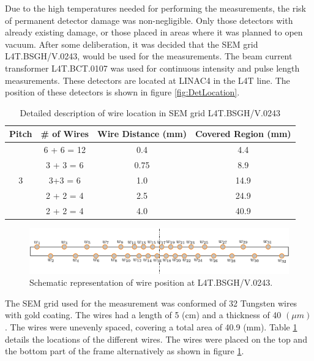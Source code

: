Due to the high temperatures needed for performing the measurements, the risk of permanent detector damage was non-negligible. Only those detectors with already existing damage, or those placed in areas where it was planned to open vacuum. After some deliberation, it was decided that the SEM grid L4T.BSGH/V.0243, would be used for the measurements. The beam current transformer L4T.BCT.0107 was used for continuous intensity and pulse length measurements. These detectors are located at LINAC4 in the L4T line. The position of these detectors is shown in figure \ref{fig:DetLocation}. 

\begin{table}[h]
    \centering
    \begin{tabular}{cccc}
    \hline
    Pitch   & \# of Wires & Wire Distance (mm) & Covered Region (mm) \\ \hline
    \multirow{5}{*}{3} & 6 + 6 = 12  & 0.4                & 4.4                 \\
                       & 3 + 3 = 6   & 0.75               & 8.9                 \\
                       & 3+3 = 6     & 1.0                & 14.9                \\
                       & 2 + 2 = 4   & 2.5                & 24.9                \\
                       & 2 + 2 = 4   & 4.0                & 40.9                \\ \hline
    \end{tabular}
    \caption{Detailed description of wire location in SEM grid L4T.BSGH/V.0243}
    \label{tab:WireSpacing}
\end{table}
\begin{figure}[h]
    \centering
    \includegraphics[width=1.0\columnwidth]{Figure_SemGridSchema/SemGridSchema.pdf}
    \caption{Schematic representation of wire position at L4T.BSGH/V.0243. }
    \label{fig:WireSpacing}
\end{figure}

The SEM grid used for the measurement was conformed of 32 Tungsten wires with gold coating. The wires had a length of 5 (cm) and a thickness of 40 $(\mu m)$. The wires were unevenly spaced, covering a total area of 40.9 (mm). Table \ref{tab:WireSpacing} details the locations of the different wires. The wires were placed on the top and the bottom part of the frame alternatively as shown in figure \ref{fig:WireSpacing}.

